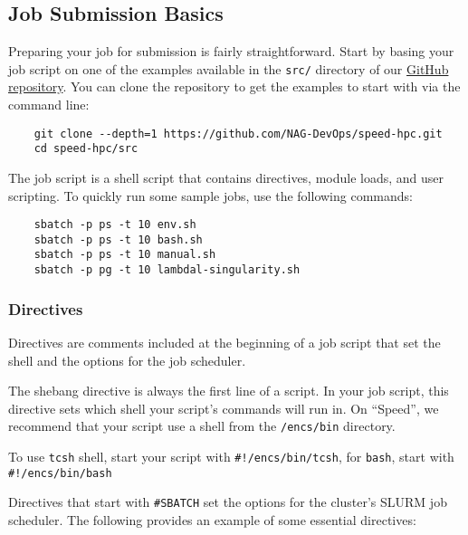 \subsection{Job Submission Basics}
\label{sect:job-submission-basics}

Preparing your job for submission is fairly straightforward.
Start by basing your job script on one of the examples available in the \texttt{src/}
directory of our \href{https://github.com/NAG-DevOps/speed-hpc}{GitHub repository}.
You can clone the repository to get the examples to start with via the command line:

\begin{verbatim}
    git clone --depth=1 https://github.com/NAG-DevOps/speed-hpc.git
    cd speed-hpc/src
\end{verbatim}

\noindent The job script is a shell script that contains directives, module loads, and user scripting.
To quickly run some sample jobs, use the following commands:
\begin{verbatim}
    sbatch -p ps -t 10 env.sh
    sbatch -p ps -t 10 bash.sh
    sbatch -p ps -t 10 manual.sh
    sbatch -p pg -t 10 lambdal-singularity.sh
\end{verbatim}

\subsubsection{Directives}
\label{sect:directives}

%
%

Directives are comments included at the beginning of a job script that set the shell
and the options for the job scheduler.

The shebang directive is always the first line of a script. In your job script,
this directive sets which shell your script's commands will run in. On ``Speed'',
we recommend that your script use a shell from the \texttt{/encs/bin} directory.

To use \texttt{tcsh} shell, start your script with \verb|#!/encs/bin/tcsh|, for
\texttt{bash}, start with \verb|#!/encs/bin/bash|

Directives that start with \verb|#SBATCH| set the options for the cluster's SLURM job scheduler.
The following provides an example of some essential directives:

